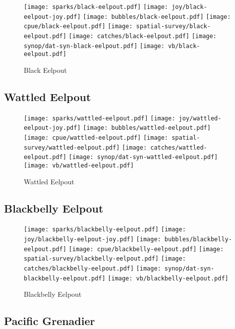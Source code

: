 \begin{figure}[htbp]
\centering
\texttt{[image: sparks/black-eelpout.pdf]}
\texttt{[image: joy/black-eelpout-joy.pdf]}
\texttt{[image: bubbles/black-eelpout.pdf]}
\texttt{[image: cpue/black-eelpout.pdf]}
\texttt{[image: spatial-survey/black-eelpout.pdf]}
\texttt{[image: catches/black-eelpout.pdf]}
\texttt{[image: synop/dat-syn-black-eelpout.pdf]}
\texttt{[image: vb/black-eelpout.pdf]}
\caption{Black Eelpout}
\end{figure}
\clearpage
\subsection*{Wattled Eelpout}

\begin{figure}[htbp]
\centering
\texttt{[image: sparks/wattled-eelpout.pdf]}
\texttt{[image: joy/wattled-eelpout-joy.pdf]}
\texttt{[image: bubbles/wattled-eelpout.pdf]}
\texttt{[image: cpue/wattled-eelpout.pdf]}
\texttt{[image: spatial-survey/wattled-eelpout.pdf]}
\texttt{[image: catches/wattled-eelpout.pdf]}
\texttt{[image: synop/dat-syn-wattled-eelpout.pdf]}
\texttt{[image: vb/wattled-eelpout.pdf]}
\caption{Wattled Eelpout}
\end{figure}
\clearpage
\subsection*{Blackbelly Eelpout}

\begin{figure}[htbp]
\centering
\texttt{[image: sparks/blackbelly-eelpout.pdf]}
\texttt{[image: joy/blackbelly-eelpout-joy.pdf]}
\texttt{[image: bubbles/blackbelly-eelpout.pdf]}
\texttt{[image: cpue/blackbelly-eelpout.pdf]}
\texttt{[image: spatial-survey/blackbelly-eelpout.pdf]}
\texttt{[image: catches/blackbelly-eelpout.pdf]}
\texttt{[image: synop/dat-syn-blackbelly-eelpout.pdf]}
\texttt{[image: vb/blackbelly-eelpout.pdf]}
\caption{Blackbelly Eelpout}
\end{figure}
\clearpage
\subsection*{Pacific Grenadier}

